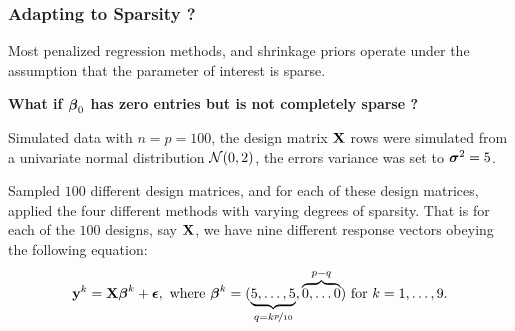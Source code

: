 \documentclass[10pt]{beamer}
\theoremstyle{plain}
\begin{document}
\begin{frame}
	\frametitle{Adapting to Sparsity ?}
	\bit
	\item Most penalized regression methods, and shrinkage priors operate under the assumption that the parameter of interest is sparse.	
	\item \textbf{What if $\boldsymbol{\beta}_0$ has zero entries but is not completely sparse ?} 
	
	\item Simulated data with $n = p = 100$, the design matrix ${\bf X}$ rows were simulated from a univariate normal distribution $\mathcal{N}(0 ,2)$, the errors variance was set to $\boldsymbol{\sigma}^2 = 5 $. 
	
	\item Sampled $100$ different design matrices, and for each of these design matrices, applied the four different methods with varying degrees of sparsity. That is for each of the $100$ designs, say ${\bf X}$, we have nine different response vectors obeying the following equation:
$$
{\bf y}^{k} = {\bf X} \boldsymbol{\beta}^{k} + \boldsymbol{\epsilon}, \ \text{where } \boldsymbol{\beta}^{k} =  ( \underbrace{ 5, \ldots ,5}_{q = k\nicefrac{p}{10}}, \overbrace{0, \ldots 0}^{p-q} ) \ \text{for } k = 1,\ldots, 9 .
$$
\eit
\end{frame}
\end{document}
